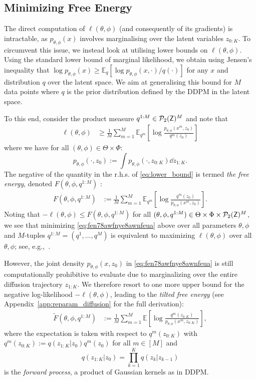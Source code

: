 \documentclass[twoside]{article}
\begin{document}
\subsection{Minimizing Free Energy}
The direct computation of $\ell(\theta, \phi)$ (and consequently of its gradients) is intractable, as $p_{\theta,\phi}(x)$ involves marginalising over the latent variables $z_{0:K}$. To circumvent this issue, we instead look at utilising lower bounds on $\ell(\theta, \phi)$. Using the standard lower bound of marginal likelihood, we obtain using Jensen's inequality that $\log p_{\theta,\phi}(x) \geq \mathbb{E}_{q}[\log p_{\theta,\phi}(x, \cdot)/q(\cdot)]$ for any $x$ and distribution $q$ over the latent space. We aim at generalising this bound for $M$ data points where $q$ is the prior distribution defined by the \gls*{DDPM} in the latent space.

To this end, consider the product measure $q^{1:M} \in \mathcal{P}_2({\mathsf{Z}})^M$ and note that
\begin{align}\label{eq:lower_bound}
\ell(\theta, \phi) &\geq \frac{1}{M}\sum_{m=1}^M\mathbb{E}_{q^m}\left[ \log \frac{p_{\theta, \phi}(x^m, z_{0})}{q^m(z_{0})} \right]
\end{align}
where we have for all $(\theta, \phi)\in \Theta\times \Phi$: 
\begin{equation}\label{eq:joint_z1k}
    p_{\theta, \phi}(\cdot, z_{0}):=\int p_{\theta,\phi}(\cdot,z_{0:K})\dd z_{1:K}.
\end{equation}
The negative of the quantity in the r.h.s. of \eqref{eq:lower_bound} is termed \textit{the free energy}, denoted $F(\theta,\phi,q^{1:M})$
\citep{bishop2006pattern}:
\begin{align}\label{eq:fen78awfnye8awnfeua}
F(\theta,\phi,q^{1:M})&:= \frac{1}{M}\sum_{m=1}^M\mathbb{E}_{q^m}\left[ \log \frac{q^m(z_{0})}{p_{\theta, \phi}(x^m, z_{0})} \right].
\end{align}
Noting that $-\ell(\theta, \phi) \leq F(\theta, \phi, q^{1:M})$ for all $(\theta, \phi, q^{1:M}) \in \Theta \times \Phi \times \mathcal{P}_2({\mathsf{Z}})^M$, we see that minimizing \eqref{eq:fen78awfnye8awnfeua} above over all parameters $\theta,\phi$ and $M$-tuples $q^{1:M}=(q^1,\dots,q^M)$ is equivalent to maximizing $\ell(\theta,\phi)$ over all $\theta,\phi$; see, e.g.,~\citet{Neal1998}. 

However, the joint density $p_{\theta, \phi}(x, z_{0})$ in \eqref{eq:fen78awfnye8awnfeua} is still computationally prohibitive to evaluate due to marginalizing over the entire diffusion trajectory $z_{1:K}$. We therefore resort to one more upper bound for the negative log-likelihood $-\ell(\theta, \phi)$, leading to the \textit{tilted free energy} (see Appendix~\ref{app:reparam_diffusion} for the full derivation):
\begin{align}
\tilde{F}(\theta, \phi, q^{1:M}) &:= \frac{1}{M}\sum_{m=1}^M\mathbb{E}\left[ \log \frac{q^m(z_{0:K})}{p_{\theta, \phi}(x^m, z_{0:K})} \right],\label{eq:free-energy}
\end{align}
where the expectation is taken with respect to $q^m(z_{0:K})$ with $q^m(z_{0:K}):=q(z_{1:K}|z_0)q^m(z_0)$ for all $m \in [M]$ and $$q(z_{1:K}|z_{0})=\prod_{k=1}^K q(z_k|z_{k-1})$$ is the \emph{forward process}, a product of Gaussian kernels as in \gls*{DDPM}.  
\end{document}
